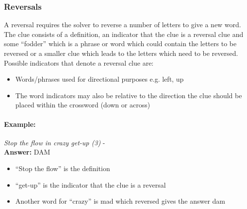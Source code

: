 \subsubsection{Reversals}

A reversal requires the solver to reverse a number of letters to give a new
word. The clue consists of a definition, an indicator that the clue is a
reversal clue and some ``fodder'' which is a phrase or word which could contain
the letters to be reversed or a smaller clue which leads to the letters which
need to be reversed. Possible indicators that denote a reversal clue are:

\begin{itemize}
    \item Words/phrases used for directional purposes e.g. left, up 
    \item The word indicators may also be relative to the direction the clue 
    should be placed within the crossword (down or across) 
\end{itemize}

\paragraph{Example:} \emph{Stop the flow in crazy get-up (3)} - \citep{shuchiReversals08} \\
\textbf{Answer:} DAM 

\begin{itemize}
    \item ``Stop the flow'' is the definition 
    \item ``get-up'' is the indicator that the clue is a reversal 
    \item Another word for ``crazy'' is mad which reversed gives the answer dam 
\end{itemize}